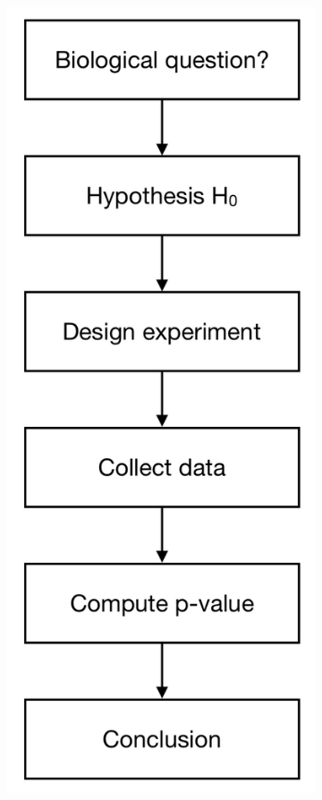 \begin{figure}[h!]
\centering
\begin{subfigure}{0.3\textwidth}
    \includegraphics[height=0.5\textheight]{main_figures/intro/fisher_paradigm.png}

\end{subfigure}
\end{figure}
